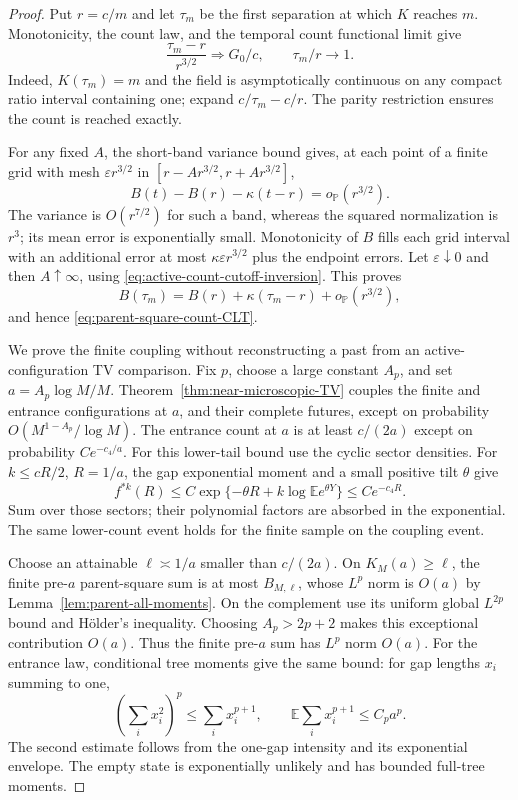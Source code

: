 \documentclass[11pt,letterpaper]{article}
\newcommand{\PP}{\mathbb P}\newcommand{\EE}{\mathbb E}
\begin{document}
\begin{proof}
Put $r=c/m$ and let $\tau_m$ be the first separation at which
$K$ reaches $m$. Monotonicity, the count law, and the temporal
count functional limit give
\begin{equation}\label{eq:active-count-cutoff-inversion}
 \frac{\tau_m-r}{r^{3/2}}\Longrightarrow G_0/c,
 \qquad \tau_m/r\longrightarrow1.
\end{equation}
Indeed, $K(\tau_m)=m$ and the field is asymptotically
continuous on any compact ratio interval containing one;
expand $c/\tau_m-c/r$. The parity restriction ensures the
count is reached exactly.

For any fixed $A$, the short-band variance bound gives,
at each point of a finite grid with mesh
$\varepsilon r^{3/2}$ in
$[r-Ar^{3/2},r+Ar^{3/2}]$,
\[
 B(t)-B(r)-\kappa(t-r)=o_{\PP}(r^{3/2}).
\]
The variance is $O(r^{7/2})$ for such a band, whereas the
squared normalization is $r^3$; its mean error is exponentially
small. Monotonicity of $B$ fills each grid interval with an
additional error at most $\kappa\varepsilon r^{3/2}$ plus
the endpoint errors. Let $\varepsilon\downarrow0$ and then
$A\uparrow\infty$, using \eqref{eq:active-count-cutoff-inversion}.
This proves
\[
 B(\tau_m)=B(r)+\kappa(\tau_m-r)+o_{\PP}(r^{3/2}),
\]
and hence \eqref{eq:parent-square-count-CLT}.

We prove the finite coupling without reconstructing a past
from an active-configuration TV comparison. Fix $p$, choose a
large constant $A_p$, and set $a=A_p\log M/M$.
Theorem~\ref{thm:near-microscopic-TV} couples the finite and
entrance configurations at $a$, and their complete futures,
except on probability $O(M^{1-A_p}/\log M)$.
The entrance count at $a$ is at least $c/(2a)$ except on
probability $Ce^{-c_4/a}$. For this lower-tail bound use the
cyclic sector densities. For $k\le cR/2$, $R=1/a$, the gap
exponential moment and a small positive tilt $\theta$ give
\[
 f^{*k}(R)\le C\exp\{-\theta R
                       +k\log\EE e^{\theta Y}\}
                         \le Ce^{-c_4R}.
\]
Sum over those sectors; their polynomial factors are absorbed
in the exponential. The same lower-count event holds for the
finite sample on the coupling event.

Choose an attainable $\ell\asymp1/a$ smaller than $c/(2a)$.
On $K_M(a)\ge\ell$, the finite pre-$a$ parent-square sum is
at most $B_{M,\ell}$, whose $L^p$ norm is $O(a)$ by
Lemma~\ref{lem:parent-all-moments}. On the complement use its
uniform global $L^{2p}$ bound and H\"older's inequality.
Choosing $A_p>2p+2$ makes this exceptional contribution $O(a)$.
Thus the finite pre-$a$ sum has $L^p$ norm $O(a)$.
For the entrance law, conditional tree moments give the same
bound: for gap lengths $x_i$ summing to one,
\[
 \left(\sum_i x_i^2\right)^p\le\sum_i x_i^{p+1},
 \qquad \EE\sum_i x_i^{p+1}\le C_p a^p.
\]
The second estimate follows from the one-gap intensity and its
exponential envelope. The empty state is exponentially unlikely
and has bounded full-tree moments.


\end{proof}
\end{document}
